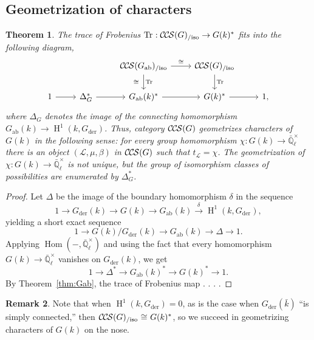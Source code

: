 \documentclass[10pt]{amsart}
\theoremstyle{plain}
\newtheorem{theorem}{Theorem}[section]
\theoremstyle{definition}
\newtheorem{remark}[theorem]{Remark}
\newcommand{\EE}{\mathbb{\bar Q}_\ell}
\newcommand{\bFq}{\bar{k}}
\newcommand{\Fq}{k}
\newcommand{\EEx}{\EE^\times}
\DeclareMathOperator{\Hom}{Hom}
\DeclareMathOperator{\Hh}{H}
\newcommand{\der}{_{\operatorname{der}}}
\newcommand{\ab}{_{\operatorname{ab}}}
\newcommand{\iso}{{\ \cong\ }}
\newcommand{\trFrob}[1]{t_{#1}}
\newcommand{\TrFrob}[1]{\operatorname{Tr}_{#1}}
\newcommand{\cs}[1]{{\mathcal{#1}}}
\newcommand{\CCS}{{\mathcal{C\hskip-.8pt C\hskip-0.8pt S}}}
\newcommand{\CCSiso}[1]{\CCS(#1)_{/\text{iso}}}
\begin{document}
\subsection{Geometrization of characters} \label{ssec:geo}

\begin{theorem}\label{thm:geo}
The trace of Frobenius $\TrFrob{} : \CCSiso{G}\to G(\Fq)^*$ fits into the following diagram,
\[
\begin{tikzcd}
\ & & \CCSiso{G\ab} \arrow{d}{\TrFrob{}}[swap]{\iso} \arrow{r}{\iso} & \CCSiso{G} \arrow{d}{\TrFrob{}}& \\
1 \arrow{r} & \Delta_G^* \arrow{r} & G\ab(k)^* \arrow{r} & G(k)^* \arrow{r} & 1,
\end{tikzcd}
\]
where $\Delta_G$ denotes the image of the connecting homomorphism $G\ab(\Fq) \to \Hh^1(\Fq, G\der)$. 
Thus, category $\CCS(G)$ geometrizes characters of $G(\Fq)$ in the following sense: for every group homomorphism $\chi : G(\Fq) \to \EEx$ there is an object $(\cs{L},\mu,\beta)$ in $\CCS(G)$ such that $\trFrob{\cs{L}} = \chi$. The geometrization of $\chi : G(\Fq) \to \EEx$ is not unique, but the group of isomorphism classes of possibilities are enumerated by $\Delta_G^*$.
\end{theorem}

\begin{proof}
Let $\Delta$ be the image of the boundary homomorphism $\delta$ in the sequence
\[
1 \to G\der(k) \to G(k) \to G\ab(k) \xrightarrow{\delta} \Hh^1(k, G\der),
\]
yielding a short exact sequence
\[
1 \to G(k) / G\der(k) \to G\ab(k) \to \Delta \to 1.
\]
Applying $\Hom(-, \EEx)$ and using the fact that every homomorphism $G(k) \to \EEx$ vanishes on $G\der(k)$, we get
\[
1 \to \Delta^* \to G\ab(k)^* \to G(k)^* \to 1.
\]
By Theorem~\ref{thm:Gab}, the trace of Frobenius map  . . . .
\end{proof}

\begin{remark}
Note that when $\Hh^1(k,G\der) = 0$, as is the case when $G\der(\bFq)$ ``is simply connected,'' then $\CCSiso{G} \iso G(\Fq)^*$, so
we succeed in geometrizing characters of $G(k)$ on the nose.
\end{remark}



\end{document}
